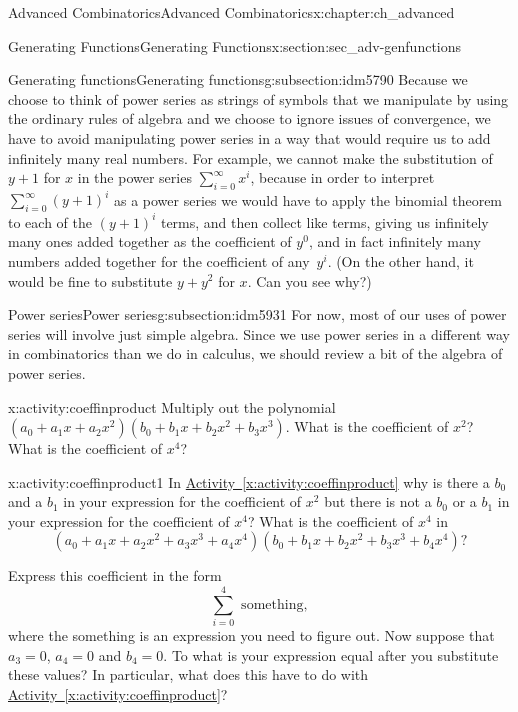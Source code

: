 \documentclass[oneside,10pt,]{book}
\numberwithin{equation}{chapter}
\begin{document}
\begin{chapterptx}{Advanced Combinatorics}{}{Advanced Combinatorics}{}{}{x:chapter:ch_advanced}
\begin{sectionptx}{Generating Functions}{}{Generating Functions}{}{}{x:section:sec_adv-genfunctions}
\begin{subsectionptx}{Generating functions}{}{Generating functions}{}{}{g:subsection:idm5790}
Because we choose to think of power series as strings of symbols that we manipulate by using the ordinary rules of algebra and we choose to ignore issues of convergence, we have to avoid manipulating power series in a way that would require us to add infinitely many real numbers. For example, we cannot make the substitution of \(y+1\) for \(x\) in the power series \(\sum_{i=0}^\infty x^i\), because in order to interpret \(\sum_{i=0}^\infty (y+1)^i\) as a power series we would have to apply the binomial theorem to each of the \((y+1)^i\) terms, and then collect like terms, giving us infinitely many ones added together as the coefficient of \(y^0\), and in fact infinitely many numbers added together for the coefficient of any~\(y^i\). (On the other hand, it would be fine to substitute \(y+y^2\) for \(x\). Can you see why?)%
\end{subsectionptx}
%
%
\typeout{************************************************}
\typeout{************************************************}
%
\begin{subsectionptx}{Power series}{}{Power series}{}{}{g:subsection:idm5931}
For now, most of our uses of power series will involve just simple algebra. Since we use power series in a different way in combinatorics than we do in calculus, we should review a bit of the algebra of power series.%
\begin{activity}{}{x:activity:coeffinproduct}%
Multiply out the polynomial \((a_0 +a_1x+a_2x^2)(b_0+b_1x+b_2x^2+b_3x^3)\). What is the coefficient of \(x^2\)? What is the coefficient of \(x^4\)?%
\end{activity}
\begin{activity}{}{x:activity:coeffinproduct1}%
In \hyperref[x:activity:coeffinproduct]{Activity~\ref{x:activity:coeffinproduct}} why is there a \(b_0\) and a \(b_1\) in your expression for the coefficient of \(x^2\) but there is not a \(b_0\) or a \(b_1\) in your expression for the coefficient of \(x^4\)? What is the coefficient of \(x^4\) in%
\begin{equation*}
(a_0+a_1x+a_2x^2+a_3x^3+a_4x^4)(b_0+b_1x+b_2x^2
+b_3x^3+b_4x^4)?
\end{equation*}
%
\par
Express this coefficient in the form%
\begin{equation*}
\sum_{i=0}^4 \mbox{ something} ,
\end{equation*}
where the something is an expression you need to figure out. Now suppose that \(a_3=0\), \(a_4=0\) and \(b_4=0\). To what is your expression equal after you substitute these values? In particular, what does this have to do with \hyperref[x:activity:coeffinproduct]{Activity~\ref{x:activity:coeffinproduct}}?%

\end{activity}
\end{subsectionptx}
\end{sectionptx}
\end{chapterptx}
\end{document}
